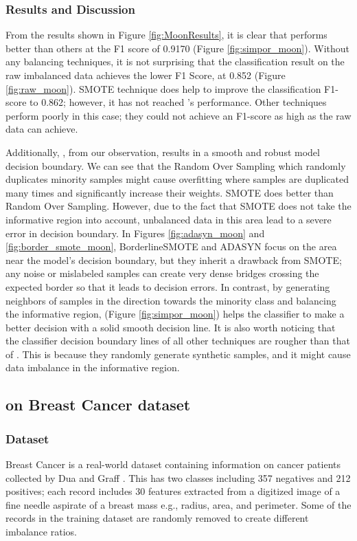 \subsubsection{Results and Discussion}
From the results shown in Figure \ref{fig:MoonResults}, it is clear that \Methodname{} performs better than others at the F1 score of 0.9170 (Figure \ref{fig:simpor_moon}). Without any balancing techniques, it is not surprising that the classification result on the raw imbalanced data achieves the lower F1 Score, at 0.852 (Figure \ref{fig:raw_moon}). SMOTE technique does help to improve the classification F1-score to 0.862; however, it has not reached \Methodname's performance. Other techniques perform poorly in this case; they could not achieve an F1-score as high as the raw data can achieve.  

Additionally, \Methodname{}, from our observation, results in a smooth and robust model decision boundary. We can see that the Random Over Sampling which randomly duplicates minority samples might cause overfitting where samples are duplicated many times and significantly increase their weights. SMOTE does better than Random Over Sampling. However, due to the fact that SMOTE does not take the informative region into account, unbalanced data in this area lead to a severe error in decision boundary. In Figures \ref{fig:adasyn_moon} and \ref{fig:border_smote_moon}, BorderlineSMOTE and ADASYN focus on the area near the model's decision boundary, but they inherit a drawback from SMOTE; any noise or mislabeled samples can create very dense bridges crossing the expected border so that it leads to decision errors. In contrast, by generating neighbors of samples in the direction towards the minority class and balancing the informative region, \Methodname{} (Figure \ref{fig:simpor_moon}) helps the classifier to make a better decision with a solid smooth decision line. It is also worth noticing that the classifier decision boundary lines of all other techniques are rougher than that of \Methodname. This is because they randomly generate synthetic samples, and it might cause data imbalance in the informative region.

\subsection{\Methodname{} on Breast Cancer dataset}

\subsubsection{Dataset}
Breast Cancer is a real-world dataset containing information on cancer patients collected by Dua and Graff \cite{breast_cancer}. This has two classes including 357 negatives and 212 positives; each record includes 30 features extracted from a digitized image of a fine needle aspirate of a breast mass e.g., radius, area, and perimeter. Some of the records in the training dataset are randomly removed to create different imbalance ratios.  


